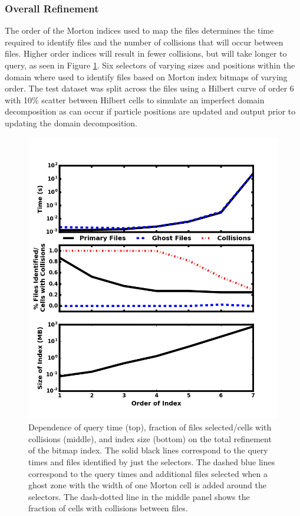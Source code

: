\documentclass[apjl]{emulateapj}
\begin{document}
\subsubsection{Overall Refinement}\label{SSS:test_order1}
The order of the Morton indices used to map the files determines the time required to identify files and the number of collisions that will occur between files. Higher order indices will result in fewer collisions, but will take longer to query, as seen in Figure \ref{fig:test_order1}. Six selectors of varying sizes and positions within the domain where used to identify files based on Morton index bitmaps of varying order. The test dataset was split across the files using a Hilbert curve of order 6 with 10\% scatter between Hilbert cells to simulate an imperfect domain decomposition as can occur if particle positions are updated and output prior to updating the domain decomposition.
%
\ifinclfig
	\begin{figure}[htbp]
	\begin{center}
	\includegraphics[width=\columnwidth,keepaspectratio]{../images/vary_order1_or0.png}
	\caption{Dependence of query time (top), fraction of files selected/cells with collisions (middle), and index size (bottom) on the total refinement of the bitmap index. The solid black lines correspond to the query times and files identified by just the selectors. The dashed blue lines correspond to the query times and additional files selected when a ghost zone with the width of one Morton cell is added around the selectors. The dash-dotted line in the middle panel shows the fraction of cells with collisions between files.}
	\label{fig:test_order1}
	\end{center}
	\end{figure}
\fi
%
\end{document}
